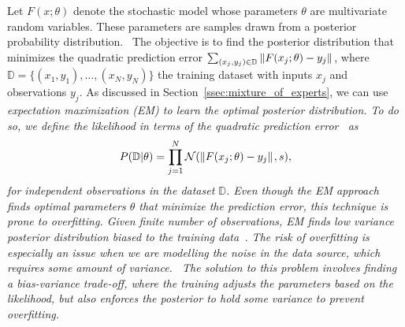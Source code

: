 Let $F(x; \theta)$ denote the stochastic model whose parameters $\theta$ are
multivariate random variables.
%
These parameters are samples drawn from a posterior probability
distribution.~
%
The objective is to find the posterior distribution that minimizes the quadratic
prediction error $\sum_{(x_j, y_j) \in \mathbb{D}} \|{F(x_j; \theta) -
y_j}\|_{{}_{}}$, where $\mathbb{D} = \{(x_1, y_1), \dots, (x_N, y_N) \}$ the training
dataset with inputs $x_j$ and observations $y_j$.
%
As discussed in Section~\ref{ssec:mixture_of_experts}, we can use
\it{expectation maximization} \normalfont (EM) to learn the optimal posterior
distribution.
%
To do so, we define the likelihood in terms of the quadratic prediction
error~ as
\begin{equation*}
  P(\mathbb{D} | \theta)  = \prod_{j=1}^{N} \mathcal{N}(\|{F(x_j; \theta) -  y_j}\|_{{}_{}}, s),
\end{equation*}
\noindent for independent observations in the dataset $\mathbb{D}$.
Even though the EM approach finds optimal parameters $\theta$ that
minimize the prediction error, this technique is prone to overfitting.
%
Given finite number of observations, EM finds low variance posterior
distribution \it{biased to the training
data}\normalfont~\cite{bishop2006pattern}. 
%
The risk of overfitting is especially an issue when we are modelling the noise
in the data source, which requires some amount of variance.~
%
The solution to this problem involves finding a \it{bias-variance
trade-off}\normalfont, where the training adjusts the parameters based on the
likelihood, but also enforces the posterior to hold some variance to prevent
overfitting.
%
